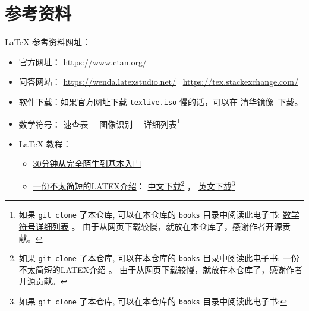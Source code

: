 \documentclass[
    11pt,
    cite=authoryear,
    device=phone,
    lang=cn,
    mode=simple,
    result=answer,
    toc=onecol,
]{elegantbook_sierxue}
\begin{document}
\newpage
\section{参考资料}%
\label{sec:latex-refs}

\LaTeX{} 参考资料网址：
\begin{itemize}
    \item 官方网址： \href{https://www.ctan.org/}{https://www.ctan.org/}
    \item 问答网站：
        \href{https://wenda.latexstudio.net/}{https://wenda.latexstudio.net/}~%
        \href{https://tex.stackexchange.com/}{https://tex.stackexchange.com/}
    \item 软件下载：如果官方网址下载 \lstinline{texlive.iso} 慢的话，可以在
    \href{https://mirrors.tuna.tsinghua.edu.cn/CTAN/systems/texlive/Images/}
                {清华镜像}~下载。
    \item 数学符号： \href{books/latex-math-symbols.pdf}{速查表}~~%
        \href{http://detexify.kirelabs.org/classify.html} {图像识别}~~%
        \href{http://mirrors .ustc.edu.cn/CTAN/info/symbols/comprehensive/symbols-a4.pdf}
        {详细列表}\footnote{
            如果 \lstinline{git clone} 了本仓库,
            可以在本仓库的 \lstinline{books}
            目录中阅读此电子书:
            \href{books/symbols-a4.pdf}{数学符号详细列表} 。
            由于从网页下载较慢，就放在本仓库了，感谢作者开源贡献。
            }
    \item \LaTeX{} 教程：
        \begin{itemize}
            \item \href{https://www.latexstudio.net/archives/9377.html}
                {30分钟从完全陌生到基本入门}
            \item
                \href{https://www.ctan.org/tex-archive/info/lshort/chinese}
                {一份不太简短的LATEX介绍}：
        \href{http://mirrors.ctan.org/info/lshort/chinese/lshort-zh-cn.pdf}
                {中文下载}\footnote{
                    如果 \lstinline{git clone} 了本仓库,
                    可以在本仓库的 \lstinline{books}
                    目录中阅读此电子书:
                    \href{books/lshort-zh-cn.pdf}{一份不太简短的LATEX介绍} 。
                    由于从网页下载较慢，就放在本仓库了，感谢作者开源贡献。
                    }
                ，
        \href{http://mirrors.ctan.org/info/lshort/english/lshort.pdf}
                {英文下载}\footnote{
                    如果 \lstinline{git clone} 了本仓库,
                    可以在本仓库的 \lstinline{books}
                    目录中阅读此电子书:
}
\end{itemize}
\end{itemize}
\end{document}
